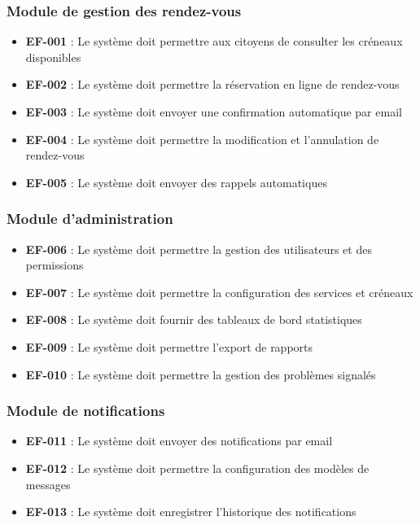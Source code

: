 \subsubsection{Module de gestion des rendez-vous}
\begin{itemize}
    \item \textbf{EF-001} : Le système doit permettre aux citoyens de consulter les créneaux disponibles
    \item \textbf{EF-002} : Le système doit permettre la réservation en ligne de rendez-vous
    \item \textbf{EF-003} : Le système doit envoyer une confirmation automatique par email
    \item \textbf{EF-004} : Le système doit permettre la modification et l'annulation de rendez-vous
    \item \textbf{EF-005} : Le système doit envoyer des rappels automatiques
\end{itemize}

\subsubsection{Module d'administration}
\begin{itemize}
    \item \textbf{EF-006} : Le système doit permettre la gestion des utilisateurs et des permissions
    \item \textbf{EF-007} : Le système doit permettre la configuration des services et créneaux
    \item \textbf{EF-008} : Le système doit fournir des tableaux de bord statistiques
    \item \textbf{EF-009} : Le système doit permettre l'export de rapports
    \item \textbf{EF-010} : Le système doit permettre la gestion des problèmes signalés
\end{itemize}

\subsubsection{Module de notifications}
\begin{itemize}
    \item \textbf{EF-011} : Le système doit envoyer des notifications par email
    \item \textbf{EF-012} : Le système doit permettre la configuration des modèles de messages
    \item \textbf{EF-013} : Le système doit enregistrer l'historique des notifications
\end{itemize}

